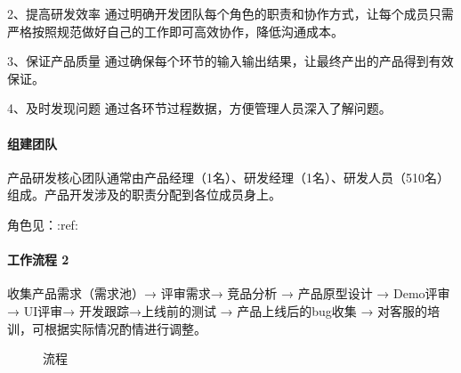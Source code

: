 \documentclass[letterpaper,10pt,english]{sphinxmanual}
\begin{document}
2、提高研发效率
通过明确开发团队每个角色的职责和协作方式，让每个成员只需严格按照规范做好自己的工作即可高效协作，降低沟通成本。

3、保证产品质量
通过确保每个环节的输入输出结果，让最终产出的产品得到有效保证。

4、及时发现问题 通过各环节过程数据，方便管理人员深入了解问题。


\paragraph{组建团队}
\label{\detokenize{chapter_project/process:id3}}
产品研发核心团队通常由产品经理（1名）、研发经理（1名）、研发人员（5\sphinxhyphen{}10名）组成。产品开发涉及的职责分配到各位成员身上。

角色见：:ref:


\paragraph{工作流程 2\sphinxfootnotemark[798]}
\label{\detokenize{chapter_project/process:id4}}%
\begin{footnotetext}[798]\sphinxAtStartFootnote
{}
%
\end{footnotetext}\ignorespaces 
收集产品需求（需求池）→ 评审需求→ 竞品分析 → 产品原型设计 → Demo评审→
UI评审→ 开发跟踪→上线前的测试 → 产品上线后的bug收集 →
对客服的培训，可根据实际情况酌情进行调整。

\begin{figure}[H]
\centering
\capstart

\noindent{}
\caption{流程}\label{\detokenize{chapter_project/process:id35}}\end{figure}
\end{document}
